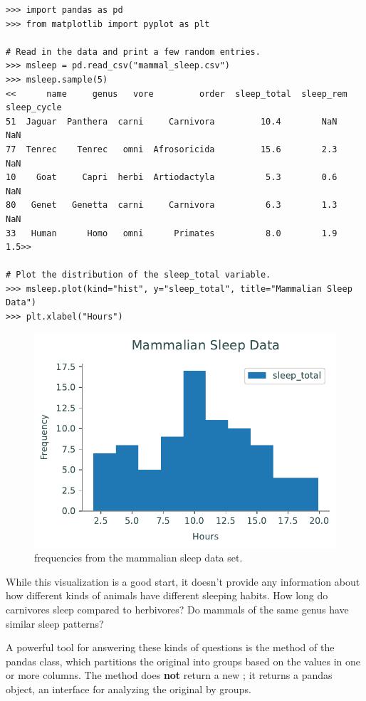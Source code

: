 \begin{lstlisting}
>>> import pandas as pd
>>> from matplotlib import pyplot as plt

# Read in the data and print a few random entries.
>>> msleep = pd.read_csv("mammal_sleep.csv")
>>> msleep.sample(5)
<<      name     genus   vore         order  sleep_total  sleep_rem  sleep_cycle
51  Jaguar  Panthera  carni     Carnivora         10.4        NaN          NaN
77  Tenrec    Tenrec   omni  Afrosoricida         15.6        2.3          NaN
10    Goat     Capri  herbi  Artiodactyla          5.3        0.6          NaN
80   Genet   Genetta  carni     Carnivora          6.3        1.3          NaN
33   Human      Homo   omni      Primates          8.0        1.9          1.5>>

# Plot the distribution of the sleep_total variable.
>>> msleep.plot(kind="hist", y="sleep_total", title="Mammalian Sleep Data")
>>> plt.xlabel("Hours")
\end{lstlisting}

\begin{figure}[H] %
    \centering
    \includegraphics[width=.7\textwidth]{figures/mammal_hist.pdf}
    \caption{ frequencies from the mammalian sleep data set.}
    \label{fig:pandas-mammals-sleep-all}
\end{figure}

While this visualization is a good start, it doesn't provide any information about how different kinds of animals have different sleeping habits.
How long do carnivores sleep compared to herbivores?
Do mammals of the same genus have similar sleep patterns?

A powerful tool for answering these kinds of questions is the  method of the pandas  class, which partitions the original  into groups based on the values in one or more columns.
The  method does \textbf{not} return a new ; it returns a pandas  object, an interface for analyzing the original  by groups.

